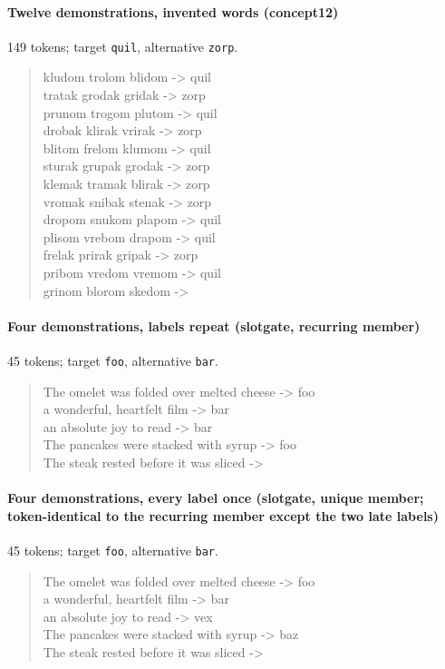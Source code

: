 \documentclass{article}
\begin{document}
\paragraph{Twelve demonstrations, invented words (concept12)} 149 tokens; target \texttt{quil}, alternative \texttt{zorp}.
\begin{quote}\small\ttfamily
kludom trolom blidom -> quil\\
tratak grodak gridak -> zorp\\
prunom trogom plutom -> quil\\
drobak klirak vrirak -> zorp\\
blitom frelom klumom -> quil\\
sturak grupak grodak -> zorp\\
klemak tramak blirak -> zorp\\
vromak snibak stenak -> zorp\\
dropom snukom plapom -> quil\\
plisom vrebom drapom -> quil\\
frelak prirak gripak -> zorp\\
pribom vredom vremom -> quil\\
grinom blorom skedom ->
\end{quote}
\paragraph{Four demonstrations, labels repeat (slotgate, recurring member)} 45 tokens; target \texttt{foo}, alternative \texttt{bar}.
\begin{quote}\small\ttfamily
The omelet was folded over melted cheese -> foo\\
a wonderful, heartfelt film -> bar\\
an absolute joy to read -> bar\\
The pancakes were stacked with syrup -> foo\\
The steak rested before it was sliced ->
\end{quote}
\paragraph{Four demonstrations, every label once (slotgate, unique member; token-identical to the recurring member except the two late labels)} 45 tokens; target \texttt{foo}, alternative \texttt{bar}.
\begin{quote}\small\ttfamily
The omelet was folded over melted cheese -> foo\\
a wonderful, heartfelt film -> bar\\
an absolute joy to read -> vex\\
The pancakes were stacked with syrup -> baz\\
The steak rested before it was sliced ->
\end{quote}
\end{document}
